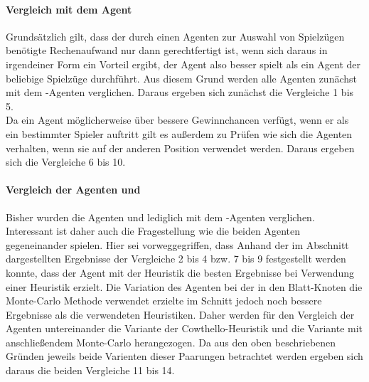 \paragraph{Vergleich mit dem Agent }
Grundsätzlich gilt, dass der durch einen Agenten zur Auswahl von Spielzügen benötigte Rechenaufwand nur dann gerechtfertigt ist, wenn sich daraus in irgendeiner Form ein Vorteil ergibt, der Agent also besser spielt als ein Agent der beliebige Spielzüge durchführt. Aus diesem Grund werden alle Agenten zunächst mit dem -Agenten verglichen. Daraus ergeben sich zunächst die Vergleiche 1 bis 5.
\\Da ein Agent möglicherweise über bessere Gewinnchancen verfügt, wenn er als ein bestimmter Spieler auftritt gilt es außerdem zu Prüfen wie sich die Agenten verhalten, wenn sie auf der anderen Position verwendet werden. Daraus ergeben sich die Vergleiche 6 bis 10. 

\paragraph{Vergleich der Agenten \mxZitat{\abp} und }
Bisher wurden die Agenten \mxZitat{\abp} und  lediglich mit dem -Agenten verglichen. Interessant ist daher auch die Fragestellung wie die beiden Agenten gegeneinander spielen. Hier sei vorweggegriffen, dass Anhand der im Abschnitt  dargestellten Ergebnisse der Vergleiche 2 bis 4 bzw. 7 bis 9 festgestellt werden konnte, dass der Agent \mxZitat{\abp} mit der Heuristik  die besten Ergebnisse bei Verwendung einer Heuristik erzielt. Die Variation des Agenten bei der in den Blatt-Knoten die Monte-Carlo Methode verwendet erzielte im Schnitt jedoch noch bessere Ergebnisse als die verwendeten Heuristiken. Daher werden für den Vergleich der Agenten untereinander die Variante der Cowthello-Heuristik und die Variante mit anschließendem Monte-Carlo herangezogen. Da aus den oben beschriebenen Gründen jeweils beide Varienten dieser Paarungen betrachtet werden ergeben sich daraus die beiden Vergleiche 11 bis 14.

